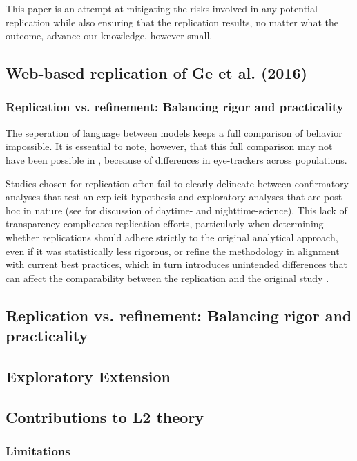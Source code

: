 This paper is an attempt at mitigating the risks involved in any potential replication while also ensuring that the replication results, no matter what the outcome, advance our knowledge, however small. 

\subsection{Web-based replication of Ge et al. (2016)}

\subsubsection{Replication vs. refinement: Balancing rigor and practicality}


The seperation of language between models keeps a full comparison of behavior impossible. It is essential to note, however, that this full comparison may not have been possible in \cite{Ge2021}, beceause of differences in eye-trackers across populations. 

Studies chosen for replication often fail to clearly delineate between confirmatory analyses that test an explicit hypothesis and exploratory analyses that are post hoc in nature (see \cite{Yanai2020} for discussion of daytime- and nighttime-science). This lack of transparency complicates replication efforts, particularly when determining whether replications should adhere strictly to the original analytical approach, even if it was statistically less rigorous, or refine the methodology in alignment with current best practices, which in turn introduces unintended differences that can affect the comparability between the replication and the original study \cite{mcmanus2022replication}.


\subsection{Replication vs. refinement: Balancing rigor and practicality}


\subsection{Exploratory Extension}

\subsection{Contributions to L2 theory}

\subsubsection{Limitations}



